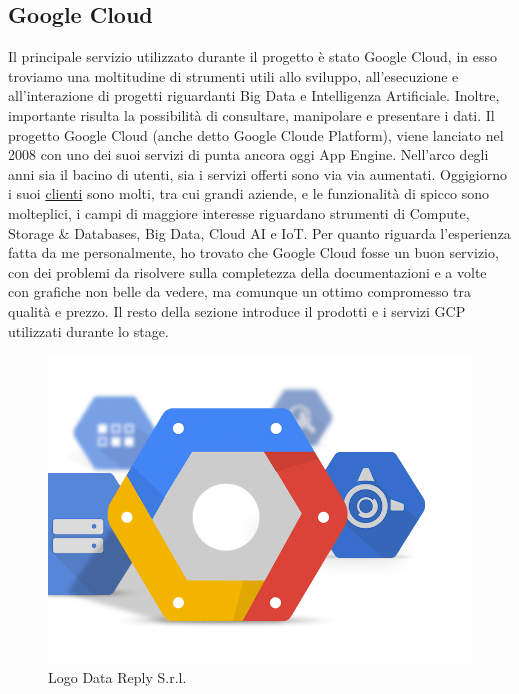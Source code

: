 \subsection{Google Cloud}
Il principale servizio utilizzato durante il progetto è stato Google Cloud, in esso troviamo una moltitudine di strumenti utili allo sviluppo, all'esecuzione e all'interazione di progetti riguardanti Big Data e Intelligenza Artificiale. Inoltre, importante risulta la possibilità di consultare, manipolare e presentare i dati.
Il progetto Google Cloud (anche detto Google Cloude Platform), viene lanciato nel 2008 con uno dei suoi servizi di punta ancora oggi \gls{App Engine}. Nell'arco degli anni sia il bacino di utenti, sia i servizi offerti sono via via aumentati. Oggigiorno i suoi \href{https://cloud.google.com/customers/#/}{clienti} sono molti, tra cui grandi aziende, e le funzionalità di spicco sono molteplici, i campi di maggiore interesse riguardano strumenti di Compute, Storage \& Databases, Big Data, Cloud AI e IoT.
Per quanto riguarda l'esperienza fatta da me personalmente, ho trovato che Google Cloud fosse un buon servizio, con dei problemi da risolvere sulla completezza della documentazioni e a volte con grafiche non belle da vedere, ma comunque un ottimo compromesso tra qualità e prezzo.
Il resto della sezione introduce il prodotti e i servizi GCP utilizzati durante lo stage.
\begin{figure}
	\centering
	\includegraphics[scale=0.3]{figures/google-cloud-platform}
	\caption[Short figure name.]{Logo Data Reply S.r.l.
		\label{fig:logoDataReply}}
\end{figure}	
